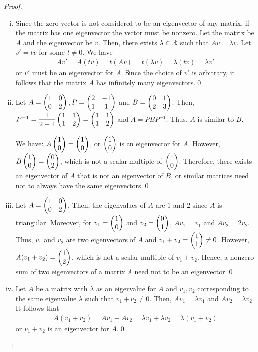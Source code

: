 \begin{proof}
    \renewcommand{\qedsymbol}{$\blacksquare$}
    \begin{enumerate}[(i)]
        \item Since the zero vector is not considered to be an eigenvector of any matrix, if the matrix has one eigenvector the vector must be nonzero.
        Let the matrix be $A$ and the eigenvector be $v$.
        Then, there exists $\lambda\in\mathbb R$ such that $Av=\lambda v$.
        Let $v'=tv$ for some $t\not=0$.
        We have 
        \[
            \begin{aligned}
                Av'=A(tv)=t(Av)=t(\lambda v)=\lambda (tv)=\lambda v'
            \end{aligned}
        \]
        or $v'$ must be an eigenvector for $A$.
        Since the choice of $v'$ is arbitrary, it follows that the matrix $A$ has infinitely many eigenvectors.\qed
        \item Let $A=\begin{pmatrix} 1 &0\\ 0 &2 \end{pmatrix},P=\begin{pmatrix} 2 &-1\\ 1 &1 \end{pmatrix}$ and $B=\begin{pmatrix} 0 &1\\ 2 &3 \end{pmatrix}$.
        Then, $P^{-1}=\dfrac{1}{2-1}\begin{pmatrix} 1 &1\\ 1 &2 \end{pmatrix}=\begin{pmatrix} 1 &1\\ 1 &2 \end{pmatrix}$ and $A=PBP^{-1}$.
        Thus, $A$ is similar to $B$.
        
        We have: $A \begin{pmatrix} 1\\ 0\end{pmatrix}=\begin{pmatrix} 1\\ 0\end{pmatrix}$, or $\begin{pmatrix} 1\\ 0\end{pmatrix}$ is an eigenvector for $A$.
        However, $B \begin{pmatrix} 1\\ 0\end{pmatrix}=\begin{pmatrix} 0\\ 2\end{pmatrix}$, which is not a scalar multiple of $\begin{pmatrix} 1\\ 0\end{pmatrix}$.
        Therefore, there exists an eigenvector of $A$ that is not an eigenvector of $B$, or similar matrices need not to always have the same eigenvectors.\qed
        
        \item Let $A=\begin{pmatrix} 1 &0\\ 0 &2 \end{pmatrix}$. Then, the eigenvalues of $A$ are $1$ and $2$ since $A$ is triangular.
        Moreover, for $v_1=\begin{pmatrix} 1\\ 0\end{pmatrix}$ and $v_2=\begin{pmatrix} 0\\ 1\end{pmatrix}$, $Av_1=v_1$ and $Av_2=2v_2$.
        Thus, $v_1$ and $v_2$ are two eigenvectors of $A$ and $v_1+v_2=\begin{pmatrix} 1\\ 1\end{pmatrix}\not=0$.
        However, $A(v_1+v_2)=\begin{pmatrix} 1\\ 2\end{pmatrix}$, which is not a scalar multiple of $v_1+v_2$.
        Hence, a nonzero sum of two eigenvectors of a matrix $A$ need not to be an eigenvector.\qed
        \item Let $A$ be a matrix with $\lambda$ as an eigenvalue for $A$ and $v_1,v_2$ corresponding to the same eigenvalue $\lambda$ such that $v_1+v_2\not=0$.
        Then, $Av_1=\lambda v_1$ and $Av_2=\lambda v_2$.
        It follows that 
        \[
            \begin{aligned}
                A(v_1+v_2)=Av_1+Av_2=\lambda v_1+\lambda v_2=\lambda(v_1+v_2)
            \end{aligned}
        \]
        or $v_1+v_2$ is an eigenvector for $A$.\qed
    \end{enumerate}
    \renewcommand{\qedsymbol}{}
\end{proof}